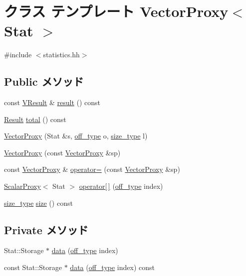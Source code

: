 \hypertarget{classStats_1_1VectorProxy}{
\section{クラス テンプレート VectorProxy$<$ Stat $>$}
\label{classStats_1_1VectorProxy}
}


{\ttfamily \#include $<$statistics.hh$>$}\subsection*{Public メソッド}
\begin{DoxyCompactItemize}
\item 
const \hyperlink{classstd_1_1vector}{VResult} \& \hyperlink{classStats_1_1VectorProxy_aba312f9e3431b1652f8b3ddf3fe105dc}{result} () const 
\item 
\hyperlink{namespaceStats_ad874d2cfd4b4a29ebd480bb2e67f20ae}{Result} \hyperlink{classStats_1_1VectorProxy_a35c6e2ed3fc81b40d69052a062113ead}{total} () const 
\item 
\hyperlink{classStats_1_1VectorProxy_a27a05786f526f097649c11fe5b72de8c}{VectorProxy} (Stat \&s, \hyperlink{namespaceStats_a2773c9fa9e4b0b04a46b37494b44842a}{off\_\-type} o, \hyperlink{namespaceStats_ada51e68d31936547d3729c82daf6b7c6}{size\_\-type} l)
\item 
\hyperlink{classStats_1_1VectorProxy_a12e67607e22ed562025db26ee351b370}{VectorProxy} (const \hyperlink{classStats_1_1VectorProxy}{VectorProxy} \&sp)
\item 
const \hyperlink{classStats_1_1VectorProxy}{VectorProxy} \& \hyperlink{classStats_1_1VectorProxy_aef02c1810ae3173d6fecdf9b9d5b2c7c}{operator=} (const \hyperlink{classStats_1_1VectorProxy}{VectorProxy} \&sp)
\item 
\hyperlink{classStats_1_1ScalarProxy}{ScalarProxy}$<$ Stat $>$ \hyperlink{classStats_1_1VectorProxy_a299d54868a222e0032da86d556d5303a}{operator\mbox{[}$\,$\mbox{]}} (\hyperlink{namespaceStats_a2773c9fa9e4b0b04a46b37494b44842a}{off\_\-type} index)
\item 
\hyperlink{namespaceStats_ada51e68d31936547d3729c82daf6b7c6}{size\_\-type} \hyperlink{classStats_1_1VectorProxy_a503ab01f6c0142145d3434f6924714e7}{size} () const 
\end{DoxyCompactItemize}
\subsection*{Private メソッド}
\begin{DoxyCompactItemize}
\item 
Stat::Storage $\ast$ \hyperlink{classStats_1_1VectorProxy_ae6e824e93e6d9aa28421cfcdcc56174e}{data} (\hyperlink{namespaceStats_a2773c9fa9e4b0b04a46b37494b44842a}{off\_\-type} index)
\item 
const Stat::Storage $\ast$ \hyperlink{classStats_1_1VectorProxy_a5a6fe17c8f511349fce598271577075d}{data} (\hyperlink{namespaceStats_a2773c9fa9e4b0b04a46b37494b44842a}{off\_\-type} index) const 
\end{DoxyCompactItemize}
